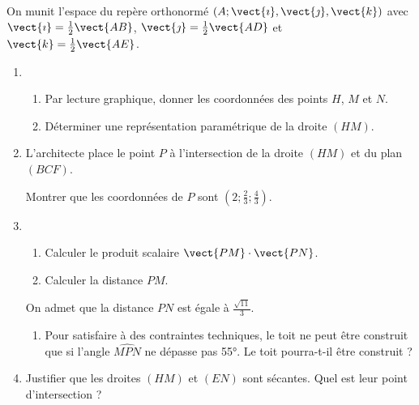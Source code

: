 \smallskip

On munit l'espace du repère orthonormé $\left(A;\vect{\imath},\vect{\jmath},\vect{k}\right)$ avec $\vect{\imath} = \frac12\vect{AB}$, $\vect{\jmath} = \frac12\vect{AD}$ et $\vect{k} = \frac12\vect{AE}$.

\begin{enumerate}
	\item 
	\begin{enumerate}
		\item Par lecture graphique, donner les coordonnées des points $H$, $M$ et $N$.
		\item Déterminer une représentation paramétrique de la droite $(HM)$.
	\end{enumerate}
	\item L'architecte place le point $P$ à l'intersection de la droite $(HM)$ et du plan $(BCF)$.
	
	Montrer que les coordonnées de $P$ sont $\left(2;\frac23;\frac43\right)$.
	\item 
	\begin{enumerate}
		\item Calculer le produit scalaire $\vect{PM}\cdot\vect{PN}$.
		\item Calculer la distance $PM$.
	\end{enumerate}
	On admet que la distance $PN$ est égale à $\frac{\sqrt{11}}{3}$.
	\begin{enumerate}[resume]
		\item Pour satisfaire à des contraintes techniques, le toit ne peut être construit que si l'angle $\widehat{MPN}$ ne dépasse pas \ang{55}. Le toit pourra-t-il être construit ?
	\end{enumerate}
	\item Justifier que les droites $(HM)$ et $(EN)$ sont sécantes. Quel est leur point d'intersection ?
\end{enumerate}
